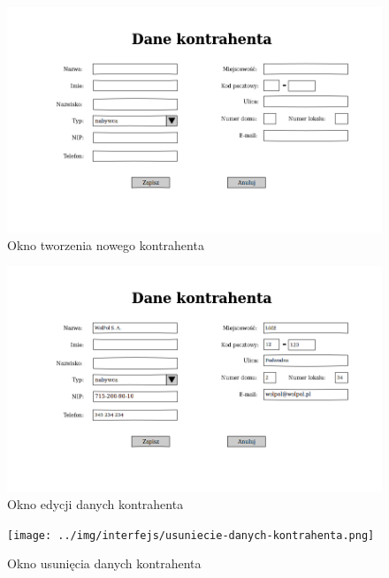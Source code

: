 \begin{figure}[!htb]
  \begin{center}
    \includegraphics[scale=0.45]{../img/interfejs/utworzenie-kontrahenta.png}
  \end{center}
  \caption{Okno tworzenia nowego kontrahenta}
\end{figure}
\FloatBarrier

\begin{figure}[!htb]
  \begin{center}
    \includegraphics[scale=0.45]{../img/interfejs/edycja-kontrahenta.png}
  \end{center}
  \caption{Okno edycji danych kontrahenta}
\end{figure}
\FloatBarrier

\begin{figure}[!htb]
  \begin{center}
    \texttt{[image: ../img/interfejs/usuniecie-danych-kontrahenta.png]}
  \end{center}
  \caption{Okno usunięcia danych kontrahenta}
\end{figure}
\FloatBarrier

